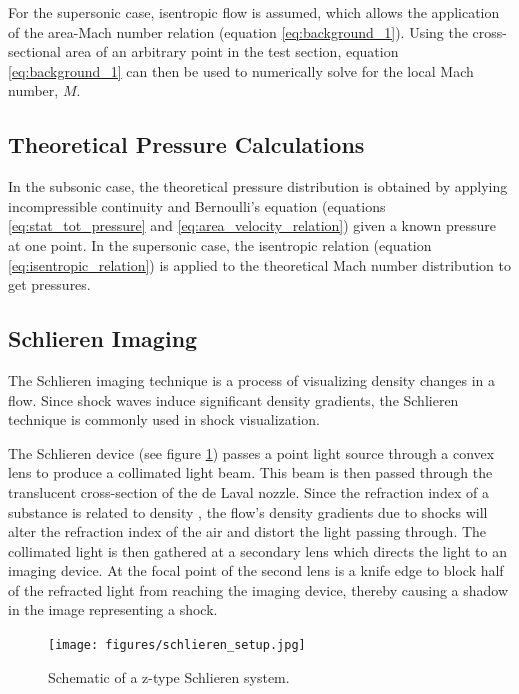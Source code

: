 \documentclass[runningheads]{llncs}
\begin{document}
\noindent
For the supersonic case, isentropic flow is assumed, which allows the application of the area-Mach number relation (equation \ref{eq:background_1}). Using the cross-sectional area of an arbitrary point in the test section, equation \ref{eq:background_1} can then be used to numerically solve for the local Mach number, $M$.

\subsection{Theoretical Pressure Calculations}
\label{sec:theoretical_pressure_cals}

In the subsonic case, the theoretical pressure distribution is obtained by applying incompressible continuity and Bernoulli's equation (equations \ref{eq:stat_tot_pressure} and \ref{eq:area_velocity_relation}) given a known pressure at one point. In the supersonic case, the isentropic relation (equation \ref{eq:isentropic_relation}) is applied to the theoretical Mach number distribution to get pressures.

\subsection{Schlieren Imaging}\label{sec: Schlieren}

The Schlieren imaging technique is a process of visualizing density changes in a flow.  Since shock waves induce significant density gradients, the Schlieren technique is commonly used in shock visualization.\newline

\noindent
The Schlieren device (see figure \ref{fig:schlieren_device}) passes a point light source through a convex lens to produce a collimated light beam. This beam is then passed through the translucent cross-section of the de Laval nozzle. Since the refraction index of a substance is related to density \cite{Rayleigh)}, the flow's density gradients due to shocks will alter the refraction index of the air and distort the light passing through. The collimated light is then gathered at a secondary lens which directs the light to an imaging device. At the focal point of the second lens is a knife edge to block half of the refracted light from reaching the imaging device, thereby causing a shadow in the image representing a shock.

\begin{figure}[h]
    \centering
    \texttt{[image: figures/schlieren\_setup.jpg]}
    \caption{Schematic of a z-type Schlieren system.\cite{Hall_2021}}
    \label{fig:schlieren_device}
\end{figure}
\end{document}
